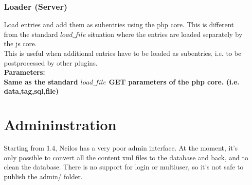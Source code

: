 \documentclass[a4paper,12pt]{article}
\begin{document}
\subsubsection{Loader (Server)}
Load entries and add them as subentries using the php core. This is different from the standard $load\_file$ situation where the entries are loaded separately by the js core.\\
This is useful when additional entries have to be loaded as subentries, i.e. to be postprocessed by other plugins.\\
\bfseries Parameters:\\
\normalfont \normalsize Same as the standard $load\_file$ GET parameters of the php core. (i.e. data,tag,sql,file)
\section{Admininstration}
Starting from 1.4, Neilos has a very poor admin interface. At the moment, it's only possible to convert all the content xml files to the database and back, and to clean the database. There is no support for login or multiuser, so it's not safe to publish the admin/ folder.
\end{document}

